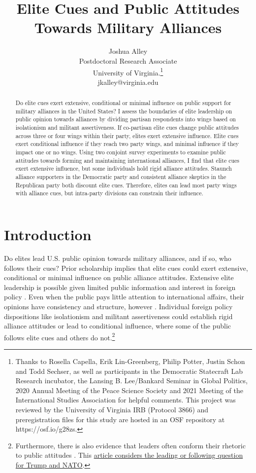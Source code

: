 \documentclass[12pt]{article}
\title{\textbf{Elite Cues and Public Attitudes Towards Military Alliances}}
\author{Joshua Alley \\
Postdoctoral Research Associate \\
University of Virginia.\thanks{Thanks to Rosella Capella, Erik Lin-Greenberg, Philip Potter, Justin Schon and Todd Sechser, as well as participants in the Democratic Statecraft Lab Research incubator, the Lansing B. Lee/Bankard Seminar in Global Politics, 2020 Annual Meeting of the Peace Science Society and 2021 Meeting of the International Studies Association for helpful comments. 
This project was reviewed by the University of Virginia IRB (Protocol 3866) and preregistration files for this study are hosted in an OSF repository at https://osf.io/g28zs.} \\
jkalley@virginia.edu
}
\date{}
\begin{document}
\maketitle 

\doublespace 

\begin{abstract}
Do elite cues exert extensive, conditional or minimal influence on public support for military alliances in the United States? 
I assess the boundaries of elite leadership on public opinion towards alliances by dividing partisan respondents into wings based on isolationism and militant assertiveness.
If co-partisan elite cues change public attitudes across three or four wings within their party, elites exert extensive influence. 
Elite cues exert conditional influence if they reach two party wings, and minimal influence if they impact one or no wings.
Using two conjoint survey experiments to examine public attitudes towards forming and maintaining international alliances, I find that elite cues exert extensive influence, but some individuals hold rigid alliance attitudes. 
Staunch alliance supporters in the Democratic party and consistent alliance skeptics in the Republican party both discount elite cues.  
Therefore, elites can lead most party wings with alliance cues, but intra-party divisions can constrain their influence.  
\end{abstract}


\newpage 


\section{Introduction}


Do elites lead U.S. public opinion towards military alliances, and if so, who follows their cues?
Prior scholarship implies that elite cues could exert extensive, conditional or minimal influence on public alliance attitudes.
Extensive elite leadership is possible given limited public information and interest in foreign policy \citep{Canes-Wrone2006, BaumPotter2008, Druckman2014}.
Even when the public pays little attention to international affairs, their opinions have consistency and structure, however \citep{Holsti1992, PageShapiro1992}.
Individual foreign policy dispositions like isolationism and militant assertiveness \citep{Herrmannetal1999, KertzerZeitzoff2017} could establish rigid alliance attitudes or lead to conditional influence, where some of the public follows elite cues and others do not.\footnote{Furthermore, there is also evidence that leaders often conform their rhetoric to public attitudes \citep{Barberaetal2019, HagerHilbig2020}. This \href{https://fivethirtyeight.com/features/is-trump-fueling-republicans-concerns-about-nato-or-echoing-them/}{article considers the leading or following question for Trump and NATO}.}
\end{document}
